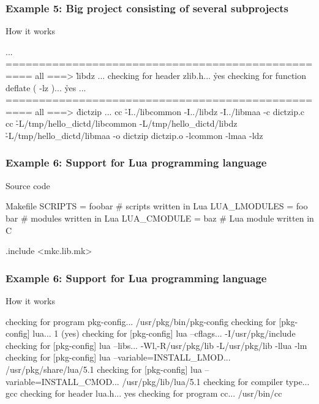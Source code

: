 \documentclass[hyperref={colorlinks=true}]{beamer}
\begin{document}
\begin{frame}[fragile]
  \frametitle{Example 5: Big project consisting of several subprojects}

  \begin{block}{How it works}
  \begin{CodeNoLabel}
...
==================================================
all ===> \h{libdz}
...
checking for header zlib.h... \h{yes}
checking for function deflate ( -lz )... \h{yes}
...
==================================================
all ===> \h{dictzip}
...
cc \h{-I../libcommon -I../libdz -I../libmaa} -c dictzip.c
cc \h{-L/tmp/hello\_dictd/libcommon -L/tmp/hello\_dictd/libdz}
   \h{-L/tmp/hello\_dictd/libmaa}  -o dictzip
   dictzip.o -lcommon -lmaa -ldz
\prompt{\$}
  \end{CodeNoLabel}
  \end{block}
\end{frame}

\begin{frame}[fragile]
  \frametitle{Example 6: Support for Lua programming language}

  \begin{block}{Source code}
  \begin{Code}{Makefile}
SCRIPTS =       foobar  # scripts written in Lua
LUA\_LMODULES =  foo bar # modules written in Lua
LUA\_CMODULE =   baz     # Lua module written in C

.include <mkc.lib.mk>
  \end{Code}
  \end{block}
\end{frame}

\begin{frame}[fragile]
  \frametitle{Example 6: Support for Lua programming language}

  \begin{block}{How it works}
  \begin{CodeNoLabel}
checking for program pkg-config...
   /usr/pkg/bin/pkg-config
checking for [pkg-config] lua... 1 (yes)
checking for [pkg-config] lua --cflags...
   -I/usr/pkg/include
checking for [pkg-config] lua --libs...
   -Wl,-R/usr/pkg/lib -L/usr/pkg/lib -llua -lm
checking for [pkg-config] lua --variable=INSTALL_LMOD...
   /usr/pkg/share/lua/5.1
checking for [pkg-config] lua --variable=INSTALL_CMOD...
   /usr/pkg/lib/lua/5.1
checking for compiler type... gcc
checking for header lua.h... yes
checking for program cc... /usr/bin/cc
\prompt{\$}
  \end{CodeNoLabel}
  \end{block}
\end{frame}
\end{document}
